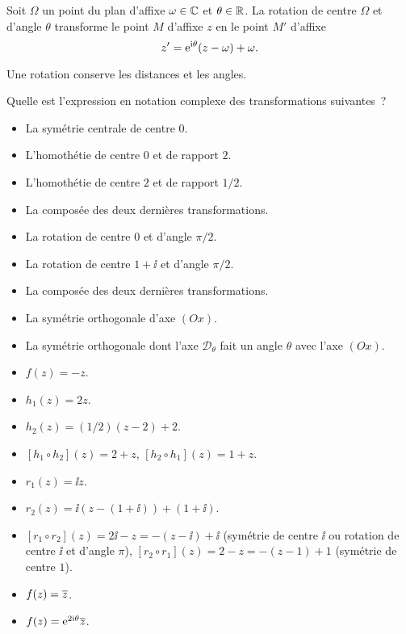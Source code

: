 \documentclass{magnolia}
\begin{document}
\begin{proposition}
Soit $\Omega$ un point du plan d'affixe $\omega\in\mathbb{C}$ et $\theta\in\mathbb{R}$. La rotation de centre $\Omega$ et d'angle $\theta$ transforme le point $M$ d'affixe $z$ en le point $M'$ d'affixe
\[z'={\rm e}^{{\rm i}\theta}(z-\omega)+\omega.\]
\end{proposition}

\begin{remarqueUnique}
\remarque Une rotation conserve les distances et les angles.
\end{remarqueUnique}

\begin{exoUnique}
\exo Quelle est l'expression en notation complexe des transformations suivantes~?
\begin{itemize}
\item La symétrie centrale de centre $0$.
\item L'homothétie de centre $0$ et de rapport $2$.
\item L'homothétie de centre $2$ et de rapport $1/2$.
\item La composée des deux dernières transformations.
\item La rotation de centre $0$ et d'angle $\pi/2$.
\item La rotation de centre $1+\ii$ et d'angle $\pi/2$.
\item La composée des deux dernières transformations.
\item La symétrie orthogonale d'axe $(Ox)$.
\item La symétrie orthogonale dont l'axe $\mathcal{D}_\theta$ fait un angle $\theta$ avec l'axe $(Ox)$.
\end{itemize}
\begin{sol}
\begin{itemize}
\item $f(z)=-z$.
\item $h_1(z)=2z$.
\item $h_2(z)=(1/2)(z-2)+2$.
\item $[h_1\circ h_2](z)=2+z$, $[h_2\circ h_1](z)=1+z$.
\item $r_1(z)=\ii z$.
\item $r_2(z)=\ii(z-(1+\ii))+(1+\ii)$.
\item $[r_1\circ r_2](z)=2\ii-z=-(z-\ii)+\ii$ (symétrie de centre $\ii$ ou rotation de centre $\ii$ et d'angle $\pi$), $[r_2\circ r_1](z)=2-z=-(z-1)+1$ (symétrie de centre $1$).
\item $f(z)=\overline{z}$.
\item $f(z)={\rm e}^{2{\rm i}\theta}\overline{z}$.
\end{itemize}
\end{sol}
\end{exoUnique}
\end{document}
